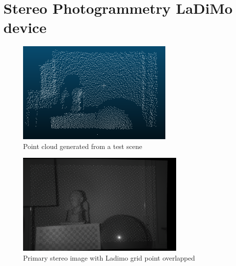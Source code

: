 \section{Stereo Photogrammetry LaDiMo device}
\label{section:stereo-device}

\begin{figure}[t]
	\begin{center}
		\includegraphics[width=.8\textwidth, height=5cm, keepaspectratio]{images/point-cloud-example.png}
		\caption{Point cloud generated from a test scene}
		\label{fig:point-cloud-input}
	\end{center}
\end{figure}

\begin{figure}[t]
	\begin{center}
		\includegraphics[width=.8\textwidth, height=5cm, keepaspectratio]{images/stereo-rectified-rgb.png}
		\caption{Primary stereo image with Ladimo grid point overlapped}
		\label{fig:primary-stereo-input}
	\end{center}
\end{figure}

